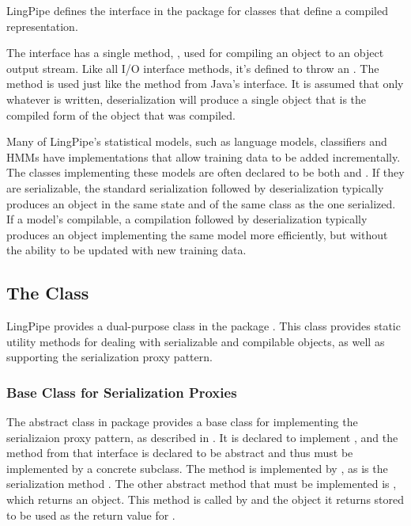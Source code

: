 LingPipe defines the interface  in the package
 for classes that define a compiled
representation. 

The interface has a single method, ,
used for compiling an object to an object output stream.  Like all I/O
interface methods, it's defined to throw an .  The
method is used just like the  method
from Java's  interface.  It is assumed that only
whatever is written, deserialization will produce a single object that
is the compiled form of the object that was compiled.  

Many of LingPipe's statistical models, such as language models,
classifiers and HMMs have implementations that allow training data to
be added incrementally.  The classes implementing these models are
often declared to be both  and .
If they are serializable, the standard serialization followed by
deserialization typically produces an object in the same state and
of the same class as the one serialized.  If a model's compilable,
a compilation followed by deserialization typically produces an
object implementing the same model more efficiently, but without the
ability to be updated with new training data. 

\subsection{The  Class}

LingPipe provides a dual-purpose class 
in the package .  This class provides static
utility methods for dealing with serializable and compilable objects,
as well as supporting the serialization proxy pattern.

\subsubsection{Base Class for Serialization Proxies}

The abstract class  in package
 provides a base class for implementing the
serializaion proxy pattern, as described in
.  It is declared to implement
, and the 
method from that interface is declared to be abstract and thus must be
implemented by a concrete subclass.  The method
 is implemented by
, as is the serialization method
.  The other abstract method that must be
implemented is , which returns an object.
This method is called by  and the object it
returns stored to be used as the return value for
.


